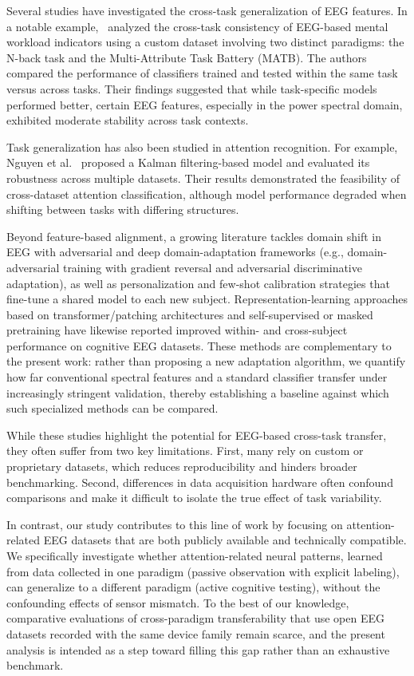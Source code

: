 \documentclass[10pt,letterpaper]{article}
\newcommand{\rev}[1]{\par\noindent\colorbox{yellow}{\parbox{\dimexpr\linewidth-2\fboxsep\relax}{#1}}\par}
\renewcommand{\rev}[1]{#1}
\begin{document}
Several studies have investigated the cross-task generalization of EEG features. In a notable example,~\cite{zhang2021cross} analyzed the cross-task consistency of EEG-based mental workload indicators using a custom dataset involving two distinct paradigms: the N-back task and the Multi-Attribute Task Battery (MATB). The authors compared the performance of classifiers trained and tested within the same task versus across tasks. Their findings suggested that while task-specific models performed better, certain EEG features, especially in the power spectral domain, exhibited moderate stability across task contexts.

Task generalization has also been studied in attention recognition. For example, Nguyen et al.~\cite{nguyen2022kalman} proposed a Kalman filtering-based model and evaluated its robustness across multiple datasets. Their results demonstrated the feasibility of cross-dataset attention classification, although model performance degraded when shifting between tasks with differing structures.

\rev{Beyond feature-based alignment, a growing literature tackles domain shift in EEG with adversarial and deep domain-adaptation frameworks (e.g., domain-adversarial training with gradient reversal and adversarial discriminative adaptation), as well as personalization and few-shot calibration strategies that fine-tune a shared model to each new subject. Representation-learning approaches based on transformer/patching architectures and self-supervised or masked pretraining have likewise reported improved within- and cross-subject performance on cognitive EEG datasets. These methods are complementary to the present work: rather than proposing a new adaptation algorithm, we quantify how far conventional spectral features and a standard classifier transfer under increasingly stringent validation, thereby establishing a baseline against which such specialized methods can be compared.}

While these studies highlight the potential for EEG-based cross-task transfer, they often suffer from two key limitations. First, many rely on custom or proprietary datasets, which reduces reproducibility and hinders broader benchmarking. Second, differences in data acquisition hardware often confound comparisons and make it difficult to isolate the true effect of task variability.

In contrast, our study contributes to this line of work by focusing on attention-related EEG datasets that are both publicly available and technically compatible. We specifically investigate whether attention-related neural patterns, learned from data collected in one paradigm (passive observation with explicit labeling), can generalize to a different paradigm (active cognitive testing), without the confounding effects of sensor mismatch. \rev{To the best of our knowledge, comparative evaluations of cross-paradigm transferability that use open EEG datasets recorded with the same device family remain scarce, and the present analysis is intended as a step toward filling this gap rather than an exhaustive benchmark.}
\end{document}
